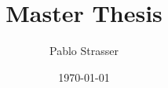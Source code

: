 \documentclass[a4paper]{book}
\title{Master Thesis}
\author{Pablo Strasser}
\date{\today}
\theoremstyle{definition}
\theoremstyle{remark}
\begin{document}
\maketitle
\dominitoc
\tableofcontents



\end{document}
